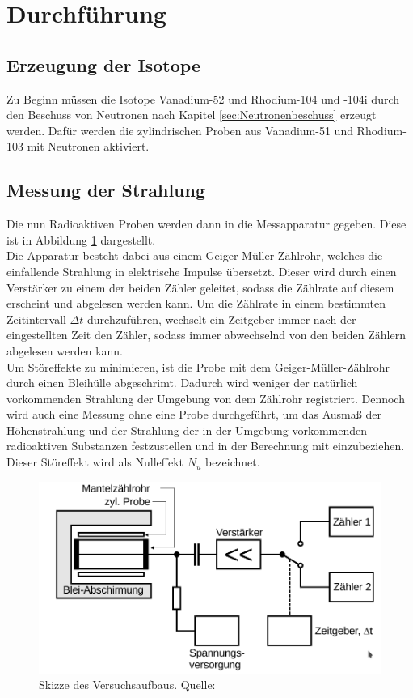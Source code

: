 \section{Durchführung}
\label{sec:Durchführung}
\subsection{Erzeugung der Isotope}
\label{sec:Erzeugung}
Zu Beginn müssen die Isotope Vanadium-52 und Rhodium-104 und -104i durch den Beschuss von Neutronen nach
Kapitel \ref{sec:Neutronenbeschuss} erzeugt werden. Dafür werden die zylindrischen Proben aus Vanadium-51
und Rhodium-103 mit Neutronen aktiviert. 
\subsection{Messung der Strahlung}
\label{sec:Messung}
Die nun Radioaktiven Proben werden dann in die Messapparatur gegeben. Diese ist in Abbildung 
\ref{fig:Apparatur} dargestellt.\\
Die Apparatur besteht dabei aus einem Geiger-Müller-Zählrohr, welches die einfallende Strahlung in 
elektrische Impulse übersetzt. Dieser wird durch einen Verstärker zu einem der beiden Zähler geleitet, 
sodass die Zählrate auf diesem erscheint und abgelesen werden kann. Um die Zählrate in einem bestimmten
Zeitintervall $\Delta t$ durchzuführen, wechselt ein Zeitgeber immer nach der eingestellten Zeit den 
Zähler, sodass immer abwechselnd von den beiden Zählern abgelesen werden kann.\\
Um Störeffekte zu minimieren, ist die Probe mit dem Geiger-Müller-Zählrohr durch einen Bleihülle 
abgeschrimt. Dadurch wird weniger der natürlich vorkommenden Strahlung der Umgebung von dem Zählrohr 
registriert. Dennoch wird auch eine Messung ohne eine Probe durchgeführt, um das Ausmaß der 
Höhenstrahlung und der Strahlung der in der Umgebung vorkommenden radioaktiven Substanzen festzustellen
und in der Berechnung mit einzubeziehen. Dieser Störeffekt wird als Nulleffekt $N_u$ bezeichnet.
\begin{figure}[H]
    \centering
    \includegraphics[scale=0.5]{content/Messapparatur.png}
    \caption{Skizze des Versuchsaufbaus. Quelle:\cite{AP01}}
    \label{fig:Apparatur}
  \end{figure}
